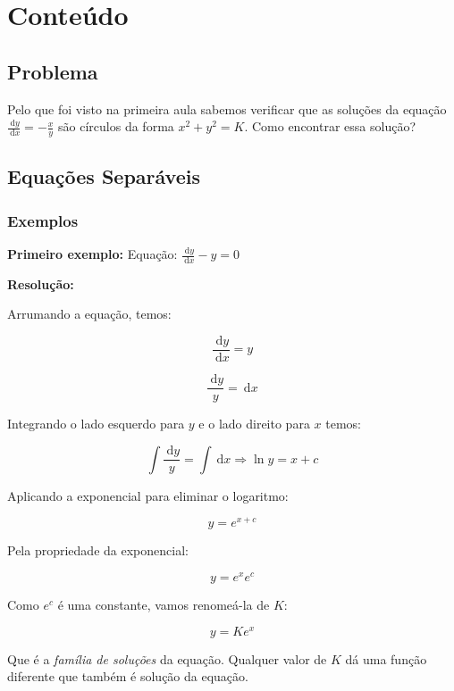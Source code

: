 \documentclass[a4paper]{article}
\newcommand{\ud}{\mathrm{\ d}}
\begin{document}
\section{Conteúdo}

\subsection{Problema}

Pelo que foi visto na primeira aula sabemos verificar que as soluções
da equação $\frac{\ud y}{\ud x} = -\frac{x}{y}$ são círculos da forma
$x^2 + y^2 = K$. Como encontrar essa solução?

\subsection{Equações Separáveis}

\subsubsection{Exemplos}

{\bf Primeiro exemplo:}
Equação: $\frac{\ud y}{\ud x} - y = 0$

{\bf Resolução:}
\begin{multicols}{2}
Arrumando a equação, temos:

$$\frac{\ud y}{\ud x} = y$$

$$\frac{\ud y}{y} = \ud x$$

Integrando o lado esquerdo para $y$ e o lado direito para $x$ temos:

$$\int \frac{\ud y}{y} = \int \ud x \Rightarrow \ln y = x+c$$

Aplicando a exponencial para eliminar o logaritmo:

$$y = e^{x+c}$$

Pela propriedade da exponencial:

$$y = e^xe^c$$

Como $e^c$ é uma constante, vamos renomeá-la de $K$:

$$y=Ke^x$$

Que é a {\em família de soluções} da equação. Qualquer valor de $K$ dá
uma função diferente que também é solução da equação.
\end{multicols}
\end{document}
